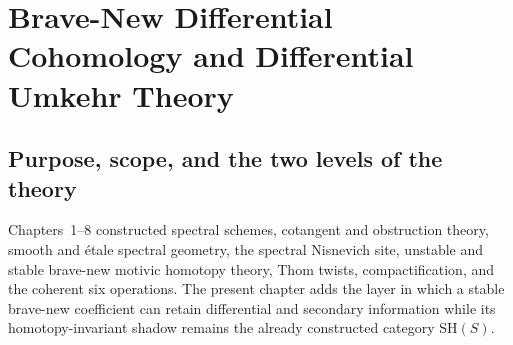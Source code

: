 
%

\providecommand{\dR}{\mathrm{dR}}
\providecommand{\op}{\mathrm{op}}
\providecommand{\Sp}{\mathrm{Sp}}
\providecommand{\SH}{\mathrm{SH}}
\providecommand{\CAlg}{\operatorname{CAlg}}
\providecommand{\Mod}{\operatorname{Mod}}
\providecommand{\Fun}{\operatorname{Fun}}
\providecommand{\Map}{\operatorname{Map}}
\providecommand{\map}{\operatorname{map}}
\providecommand{\colim}{\operatorname*{colim}}
\providecommand{\lim}{\operatorname*{lim}}
\providecommand{\fib}{\operatorname{fib}}
\providecommand{\cofib}{\operatorname{cofib}}
\providecommand{\Sym}{\operatorname{Sym}}
\providecommand{\SymSeq}{\operatorname{SymSeq}}
\providecommand{\DiffSp}{\operatorname{DiffSp}}
\providecommand{\Disc}{\operatorname{Disc}}
\providecommand{\Nis}{\mathrm{Nis}}
\providecommand{\cn}{\mathrm{cn}}
\providecommand{\fp}{\mathrm{fp}}
\providecommand{\id}{\operatorname{id}}
\providecommand{\RedInf}{\operatorname{Red}_{\mathrm{inf}}}
\providecommand{\CrystInf}{\operatorname{Crys}_{\mathrm{inf}}}
\providecommand{\CrysCoref}{\operatorname{Crys}^{!}_{\mathrm{inf}}}
\providecommand{\DiffPush}{\widehat{(-)}_{!}}

\chapter{Brave-New Differential Cohomology and Differential Umkehr Theory}
\label{chap:brave-new-differential-cohomology}
\label{chap:brave-new-infinitesimal-geometry}

\section{Purpose, scope, and the two levels of the theory}
\label{sec:bn-diff-purpose}

Chapters~1--8 constructed spectral schemes, cotangent and obstruction theory,
smooth and \'etale spectral geometry, the spectral Nisnevich site, unstable
and stable brave-new motivic homotopy theory, Thom twists, compactification,
and the coherent six operations.  The present chapter adds the layer in which
a stable brave-new coefficient can retain differential and secondary
information while its homotopy-invariant shadow remains the already constructed
category \(\SH(S)\).

